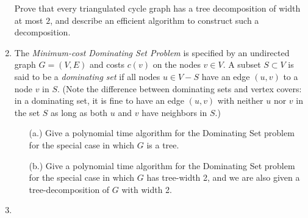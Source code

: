 \documentclass[12pt]{article}
\def\setminus{{-}}
\begin{document}
\begin{enumerate}
Prove that every triangulated cycle graph has a
tree decomposition of width at most $2$,
and describe an efficient algorithm to construct
such a decomposition.



\item

The {\em Minimum-cost Dominating Set
Problem} is specified by an undirected
graph $G=(V,E)$ and costs $c(v)$ on the nodes $v \in V$. A subset $S \subset V$
is said to be a {\em dominating set}
if all nodes $u \in V\setminus S$ have an edge
$(u,v)$ to a node $v$ in $S$. (Note the difference between dominating
sets and vertex covers: in a dominating set, it is fine to have an edge $(u,v)$
with neither $u$ nor $v$ in the set $S$ as long as both $u$ and $v$ have
neighbors in $S$.)
\begin{itemize}
\item[(a.)] Give a polynomial time algorithm for the  Dominating Set problem
for the special case in which $G$ is a tree.
\item[(b.)] Give a polynomial time algorithm for the  Dominating Set problem
for the special case in which $G$ has tree-width 2, and we are also given
a tree-decomposition of $G$ with width 2.
\end{itemize}


\item


\end{enumerate}
\end{document}

